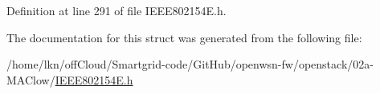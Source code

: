 Definition at line 291 of file I\+E\+E\+E802154\+E.\+h.



The documentation for this struct was generated from the following file\+:\begin{DoxyCompactItemize}
\item 
/home/lkn/off\+Cloud/\+Smartgrid-\/code/\+Git\+Hub/openwsn-\/fw/openstack/02a-\/\+M\+A\+Clow/\hyperlink{_i_e_e_e802154_e_8h}{I\+E\+E\+E802154\+E.\+h}\end{DoxyCompactItemize}
